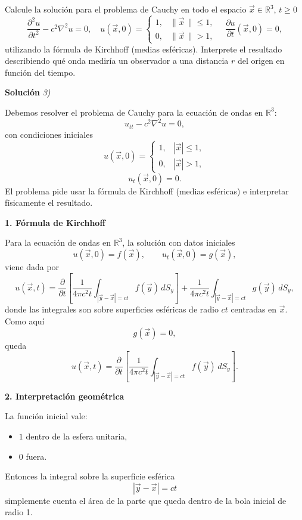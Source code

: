\documentclass[11pt,spanish]{article}
\newcommand{\norm}[1]{\lVert{#1}\,\rVert}
\newcounter{problema}
\newcommand{\prob}{\stepcounter{problema} \vspace{.5cm} \noindent{\bf Problema \arabic{problema}: }}
\begin{document}
\prob Calcule la solución para el problema de Cauchy en todo el espacio \(\vec{x}\in\mathbb{R}^3\), \(t\ge0\)
\[
\frac{\partial^2 u}{\partial t^2} - c^2 \nabla^2 u = 0,\quad u(\vec{x},0)=\begin{cases} 1, & \norm{\vec{x}}\le 1,\\ 0, & \norm{\vec{x}}>1, \end{cases} \quad \frac{\partial u}{\partial t}(\vec{x},0)=0,
\]
utilizando la fórmula de Kirchhoff (medias esféricas). Interprete el resultado describiendo qué onda mediría un observador a una distancia \(r\) del origen en función del tiempo.

\vspace{0.5cm}
{\bf Soluci\'on }{\em 3)}
\vspace{0.5cm}

Debemos resolver el problema de Cauchy para la ecuación de ondas en $\mathbb{R}^3$:
$$
u_{tt}-c^2\nabla^2u=0,
$$
con condiciones iniciales
$$
u(\vec x,0)=
\begin{cases}
1,& |\vec x|\le1,\\
0,& |\vec x|>1,
\end{cases}
$$
$$
u_t(\vec x,0)=0.
$$
El problema pide usar la fórmula de Kirchhoff (medias esféricas) e interpretar físicamente el resultado. 

{\bf 1. Fórmula de Kirchhoff}

Para la ecuación de ondas en $\mathbb R^3$, la solución con datos iniciales
$$
u(\vec x,0)=f(\vec x),
\qquad
u_t(\vec x,0)=g(\vec x),
$$
viene dada por
$$
u(\vec x,t)
=
\frac{\partial}{\partial t}
\left[
\frac1{4\pi c^2 t}
\int_{|\vec y-\vec x|=ct}
f(\vec y)\,dS_y
\right]
+
\frac1{4\pi c^2 t}
\int_{|\vec y-\vec x|=ct}
g(\vec y)\,dS_y,
$$
donde las integrales son sobre superficies esf\'ericas de radio $ct$ centradas en $\vec x$.
Como aquí
$$
g(\vec x)=0,
$$
queda
$$
u(\vec x,t)
=
\frac{\partial}{\partial t}
\left[
\frac1{4\pi c^2 t}
\int_{|\vec y-\vec x|=ct}
f(\vec y)\,dS_y
\right].
$$

{\bf 2. Interpretación geométrica}

La función inicial vale:
\begin{itemize}
\item $1$ dentro de la esfera unitaria,
\item $0$ fuera.
\end{itemize}
Entonces la integral sobre la superficie esf\'erica
$$
|\vec y-\vec x|=ct
$$
simplemente cuenta el área de la parte que queda dentro de la bola inicial de radio 1.
\end{document}
